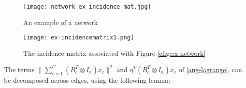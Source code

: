 \begin{figure}[h]
\centering
\texttt{[image: network-ex-incidence-mat.jpg]}
\caption{An example of a network}
\label{efig:ex-network}
\end{figure}

\begin{figure}[h]
\centering
\texttt{[image: ex-incidencematrix1.png]}
\caption{The incidence matrix associated with Figure \eqref{efig:ex-network}}
\label{fig:incidence-matrix}
\end{figure}

The terms \(\|\sum_{c=1}^C\left(B_c^T \otimes I_n\right)\bar{x}_c\|^2\) and \( \eta^T\left(B_c^T \otimes I_n\right)\bar{x}_c \) of \eqref{aug-lagrange}, can be decomposed across edges, using the following lemma:

